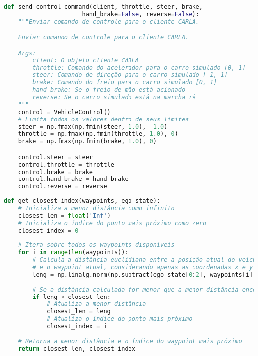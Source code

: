 \documentclass[
	12pt,				%
	oneside, %
	a4paper,			%
	english,			%
	french,				%
	spanish,			%
	brazil				%
	]{abntex2}
\begin{document}
\begin{apendicesenv}
\begin{lstlisting}[language=Python, caption=Integração do controlador com o sistema CARLA., label=lst:system-integration]
def send_control_command(client, throttle, steer, brake,
                      hand_brake=False, reverse=False):
    """Enviar comando de controle para o cliente CARLA.

    Enviar comando de controle para o cliente CARLA.

    Args:
        client: O objeto cliente CARLA
        throttle: Comando do acelerador para o carro simulado [0, 1]
        steer: Comando de direção para o carro simulado [-1, 1]
        brake: Comando do freio para o carro simulado [0, 1]
        hand_brake: Se o freio de mão está acionado
        reverse: Se o carro simulado está na marcha ré
    """
    control = VehicleControl()
    # Limita todos os valores dentro de seus limites
    steer = np.fmax(np.fmin(steer, 1.0), -1.0)
    throttle = np.fmax(np.fmin(throttle, 1.0), 0)
    brake = np.fmax(np.fmin(brake, 1.0), 0)

    control.steer = steer
    control.throttle = throttle
    control.brake = brake
    control.hand_brake = hand_brake
    control.reverse = reverse
\end{lstlisting}

\begin{lstlisting}[language=Python, caption=Implementação da função para determinação do \textit{waypoint} mais próximo., label=lst:closest_index_implementation]
def get_closest_index(waypoints, ego_state):
    # Inicializa a menor distância como infinito
    closest_len = float('Inf')
    # Inicializa o índice do ponto mais próximo como zero
    closest_index = 0
    
    # Itera sobre todos os waypoints disponíveis
    for i in range(len(waypoints)):
        # Calcula a distância euclidiana entre a posição atual do veículo (ego_state)
        # e o waypoint atual, considerando apenas as coordenadas x e y (primeiros dois elementos)
        leng = np.linalg.norm(np.subtract(ego_state[0:2], waypoints[i][0:2]))
        
        # Se a distância calculada for menor que a menor distância encontrada até agora
        if leng < closest_len:
            # Atualiza a menor distância
            closest_len = leng
            # Atualiza o índice do ponto mais próximo
            closest_index = i
    
    # Retorna a menor distância e o índice do waypoint mais próximo
    return closest_len, closest_index
\end{lstlisting}


\end{apendicesenv}
\end{document}

